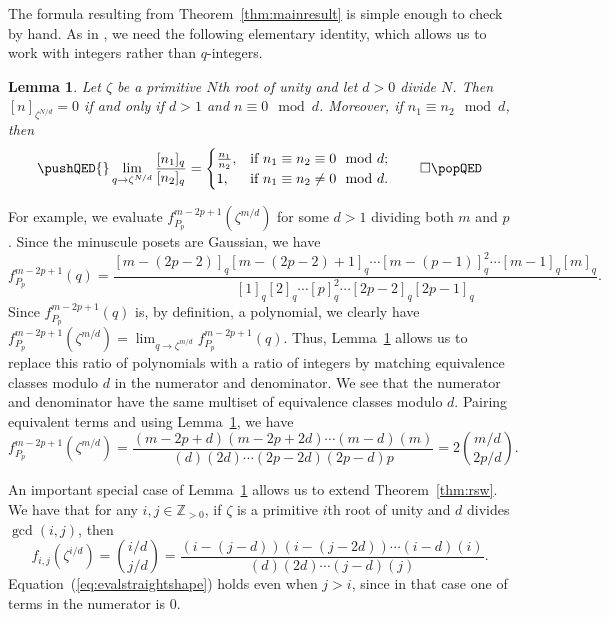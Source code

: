 \documentclass[12pt]{amsart}
\newtheorem{lemma}[theorem]{Lemma}
\theoremstyle{definition}
\theoremstyle{remark}
\numberwithin{equation}{section}
\begin{document}
The formula resulting from Theorem~\ref{thm:mainresult} is simple enough to check by hand. 
As in \cite[Proof of Theorem 7.1]{Reiner.Stanton.White}, we need the following elementary identity, which allows us to work with integers rather than $q$-integers. 


\begin{lemma}\label{lem:evalq}
Let $\zeta$ be a primitive $N$th root of unity and let $d > 0$ divide $N$. Then $[n]_{\zeta^{N/d}} = 0$ if and only if $d > 1$ and $n \equiv 0 \mod d$. Moreover, if $n_1 \equiv n_2 \mod d$, then 
\begin{equation}\label{eq:evalq}
\pushQED{\qed}
\lim \limits_{q \rightarrow \zeta^{N/d}} \frac{[n_1]_q}{[n_2]_q} = 
\begin{cases}
\frac{n_1}{n_2}, &\text{if }  n_1 \equiv n_2 \equiv 0 \mod d; \\
1, &\text{if } n_1 \equiv n_2 \neq 0 \mod d.
\end{cases} \qedhere \popQED
\end{equation}
\end{lemma}

For example, we evaluate $f^{m-2p+1}_{P_p}(\zeta^{m/d})$ for some $d > 1$ dividing both $m$ and $p$. Since the minuscule posets are Gaussian, we have
\tiny
\[   f^{m-2p+1}_{P_p}(q) = \frac{[m-(2p-2)]_{q}[m-(2p-2)+1]_{q} \cdots [m-(p-1)]_{q}^2 \cdots [m-1]_{q}[m]_{q}}{[1]_{q}[2]_{q} \cdots [p]_{q}^2 \cdots [2p-2]_{q}[2p-1]_{q}}. \]
\normalsize
Since $f^{m-2p+1}_{P_p}(q)$ is, by definition, a polynomial, we clearly have $f^{m-2p+1}_{P_p}(\zeta^{m/d}) = \lim_{q \rightarrow \zeta^{m/d}} f^{m-2p+1}_{P_p}(q)$.
Thus, Lemma~\ref{lem:evalq} allows us to replace this ratio of polynomials with a ratio of integers by matching equivalence classes modulo $d$ in the numerator and denominator. We see that the numerator and denominator have the same multiset of equivalence classes modulo $d$. Pairing equivalent terms and using Lemma~\ref{lem:evalq}, we have
\[ f^{m-2p+1}_{P_p}(\zeta^{m/d}) = \frac{(m-2p+d)(m-2p+2d) \cdots  (m-d)(m)}{(d) (2d)\cdots  (2p-2d)(2p-d) p} = 2 \binom{m/d}{2p/d}.\]     

An important special case of Lemma~\ref{lem:evalq} allows us to extend Theorem~\ref{thm:rsw}. We have that for any $i, j \in \mathbb{Z}_{> 0}$, if $\zeta$ is a primitive $i$th root of unity and $d$ divides $\gcd(i,j)$, then
\begin{equation}\label{eq:evalstraightshape}
f_{i,j}(\zeta^{i/d}) = \binom{i/d}{j/d} = \frac{(i-(j-d))(i-(j-2d)) \cdots  (i-d)(i)}{(d)  (2d)  \cdots  (j-d) (j)}. 
\end{equation}
Equation~(\ref{eq:evalstraightshape}) holds even when $j > i$, since in that case one of terms in the numerator is $0$. 
\end{document}
